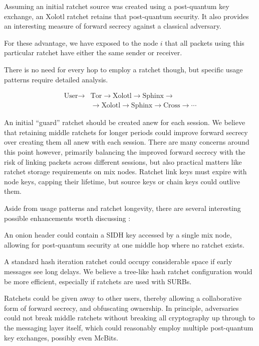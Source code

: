 \documentclass[twoside,letterpaper]{sig-alternate}
\begin{document}
\smallskip

Assuming an initial ratchet source was created using a post-quantum
key exchange, an Xolotl ratchet retains that post-quantum security.
It also provides an interesting measure of forward secrecy against
a classical adversary. 

For these advantage, we have exposed to the node $i$ that all packets
using this particular ratchet have either the same sender or receiver.

There is no need for every hop to employ a ratchet though, but
 specific usage patterns require detailed analysis. 

\[ \begin{aligned}
\textrm{User} \to &\textrm{Tor} \to \textrm{Xolotl} \to \textrm{Sphinx} \to \\
\quad &\to \textrm{Xolotl} \to \textrm{Sphinx} \to \textrm{Cross} \to \cdots 
\end{aligned} \]

An initial ``guard'' ratchet should be created anew for each session.
We believe that retaining middle ratchets for longer periods could
improve forward secrecy over creating them all anew with each session. 
There are many concerns around this point however, primarily balancing
the improved forward secrecy with the risk of linking packets across
different sessions, but
 also practical matters like ratchet storage requirements on mix nodes.  
Ratchet link keys must expire with node keys, capping their lifetime,
but source keys or chain keys could outlive them.

Aside from usage patterns and ratchet longevity,
there are several interesting possible enhancements worth discussing : 

An onion header could contain a SIDH key accessed by a single mix node,
allowing for post-quantum security at one middle hop
 where no ratchet exists.

A standard hash iteration ratchet could occupy considerable space
 if early messages see long delays. 
We believe a tree-like hash ratchet configuration would be more efficient,
 especially if ratchets are used with SURBs.

Ratchets could be given away to other users, thereby allowing a
collaborative form of forward secrecy, and obfuscating ownership. 
In principle, adversaries could not break middle ratchets without
breaking all cryptography up through to the messaging layer itself,
which could reasonably employ multiple post-quantum key exchanges,
 possibly even McBits.







\end{document}
